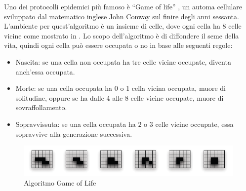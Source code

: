 Uno dei protocolli epidemici più famoso è “Game of life” \cite{gardner1970-gameoflife}, un automa cellulare sviluppato dal matematico inglese John Conway sul finire degli anni sessanta. L'ambiente per quest'algoritmo è un insieme di celle, dove ogni cella ha 8 celle vicine come mostrato in . Lo scopo dell'algoritmo è di diffondere il seme della vita, quindi ogni cella può essere occupata o no in base alle seguenti regole:
\begin{itemize}
	\item Nascita: se una cella non occupata ha tre celle vicine occupate, diventa anch'essa occupata.
	\item Morte: se una cella occupata ha $0$ o $1$ cella vicina occupata, muore di solitudine, oppure se ha dalle 4 alle 8 celle vicine occupate, muore di sovraffollamento.
	\item Sopravvissuta: se una cella occupata ha $2$ o $3$ celle vicine occupate, essa sopravvive alla generazione successiva.
\end{itemize}

\begin{figure}[bh]
\centering
\includegraphics[width=1\linewidth,keepaspectratio]{Images/algoritmi_gossip/game_of_life}
\caption[Algoritmo Game of Life]{Algoritmo Game of Life}
\label{fig:game_of_life}
\end{figure}

